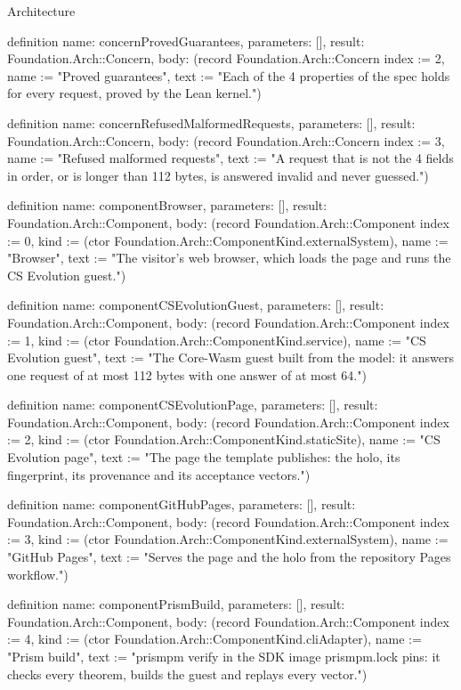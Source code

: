 \begin{lexlean}{Architecture}
\begin{semanticmodule}
definition{
  name: concernProvedGuarantees,
  parameters: [],
  result: Foundation.Arch::Concern,
  body: (record Foundation.Arch::Concern {index := 2, name := "Proved guarantees", text := "Each of the 4 properties of the spec holds for every request, proved by the Lean kernel."})
}

definition{
  name: concernRefusedMalformedRequests,
  parameters: [],
  result: Foundation.Arch::Concern,
  body: (record Foundation.Arch::Concern {index := 3, name := "Refused malformed requests", text := "A request that is not the 4 fields in order, or is longer than 112 bytes, is answered invalid and never guessed."})
}

definition{
  name: componentBrowser,
  parameters: [],
  result: Foundation.Arch::Component,
  body: (record Foundation.Arch::Component {index := 0, kind := (ctor Foundation.Arch::ComponentKind.externalSystem), name := "Browser", text := "The visitor's web browser, which loads the page and runs the CS Evolution guest."})
}

definition{
  name: componentCSEvolutionGuest,
  parameters: [],
  result: Foundation.Arch::Component,
  body: (record Foundation.Arch::Component {index := 1, kind := (ctor Foundation.Arch::ComponentKind.service), name := "CS Evolution guest", text := "The Core-Wasm guest built from the model: it answers one request of at most 112 bytes with one answer of at most 64."})
}

definition{
  name: componentCSEvolutionPage,
  parameters: [],
  result: Foundation.Arch::Component,
  body: (record Foundation.Arch::Component {index := 2, kind := (ctor Foundation.Arch::ComponentKind.staticSite), name := "CS Evolution page", text := "The page the template publishes: the holo, its fingerprint, its provenance and its acceptance vectors."})
}

definition{
  name: componentGitHubPages,
  parameters: [],
  result: Foundation.Arch::Component,
  body: (record Foundation.Arch::Component {index := 3, kind := (ctor Foundation.Arch::ComponentKind.externalSystem), name := "GitHub Pages", text := "Serves the page and the holo from the repository Pages workflow."})
}

definition{
  name: componentPrismBuild,
  parameters: [],
  result: Foundation.Arch::Component,
  body: (record Foundation.Arch::Component {index := 4, kind := (ctor Foundation.Arch::ComponentKind.cliAdapter), name := "Prism build", text := "prismpm verify in the SDK image prismpm.lock pins: it checks every theorem, builds the guest and replays every vector."})
}


\end{semanticmodule}
\end{lexlean}
